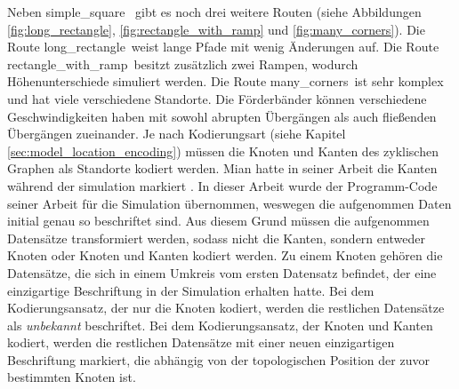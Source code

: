 \newline
\newline
Neben \glqq simple\_square \grqq\ gibt es noch drei weitere Routen (siehe Abbildungen \ref{fig:long_rectangle}, \ref{fig:rectangle_with_ramp} und \ref{fig:many_corners}).
Die Route \glqq long\_rectangle\grqq\ weist lange Pfade mit wenig Änderungen auf.
Die Route \glqq rectangle\_with\_ramp\grqq\ besitzt zusätzlich zwei Rampen, wodurch Höhenunterschiede simuliert werden.
Die Route \glqq many\_corners\grqq\ ist sehr komplex und hat viele verschiedene Standorte.
Die Förderbänder können verschiedene Geschwindigkeiten haben mit sowohl abrupten Übergängen als auch fließenden Übergängen zueinander.
\newline
\newline
Je nach Kodierungsart (siehe Kapitel \ref{sec:model_location_encoding}) müssen die Knoten und Kanten des zyklischen Graphen als Standorte kodiert werden.
Mian hatte in seiner Arbeit die Kanten während der simulation markiert \cite{naveedThesis}.
In dieser Arbeit wurde der Programm-Code seiner Arbeit für die Simulation übernommen, weswegen die aufgenommen Daten initial genau so beschriftet sind.
Aus diesem Grund müssen die aufgenommen Datensätze transformiert werden, sodass nicht die Kanten, sondern entweder Knoten oder Knoten und Kanten kodiert werden.
Zu einem Knoten gehören die Datensätze, die sich in einem Umkreis vom ersten Datensatz befindet, der eine einzigartige Beschriftung in der Simulation erhalten hatte.
Bei dem Kodierungsansatz, der nur die Knoten kodiert, werden die restlichen Datensätze als \textit{unbekannt} beschriftet.
Bei dem Kodierungsansatz, der Knoten und Kanten kodiert, werden die restlichen Datensätze mit einer neuen einzigartigen Beschriftung markiert, die abhängig von der
topologischen Position der zuvor bestimmten Knoten ist.
